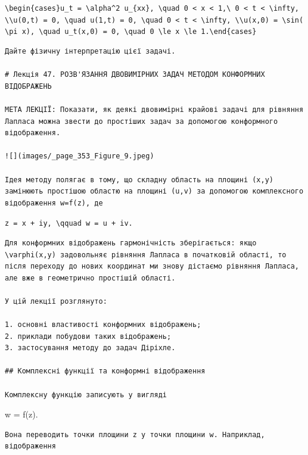 \documentclass[
  ukrainian,
]{article}
\begin{document}
\texttt{\textbackslash{}begin\{cases\}u\_t\ =\ \textbackslash{}alpha\^{}2\ u\_\{xx\},\ \textbackslash{}quad\ 0\ \textless{}\ x\ \textless{}\ 1,\textbackslash{}\ 0\ \textless{}\ t\ \textless{}\ \textbackslash{}infty,\ \textbackslash{}\textbackslash{}u(0,t)\ =\ 0,\ \textbackslash{}quad\ u(1,t)\ =\ 0,\ \textbackslash{}quad\ 0\ \textless{}\ t\ \textless{}\ \textbackslash{}infty,\ \textbackslash{}\textbackslash{}u(x,0)\ =\ \textbackslash{}sin(\textbackslash{}pi\ x),\ \textbackslash{}quad\ u\_t(x,0)\ =\ 0,\ \textbackslash{}quad\ 0\ \textbackslash{}le\ x\ \textbackslash{}le\ 1.\textbackslash{}end\{cases\}}

\begin{verbatim}
Дайте фізичну інтерпретацію цієї задачі.

# Лекція 47. РОЗВ'ЯЗАННЯ ДВОВИМІРНИХ ЗАДАЧ МЕТОДОМ КОНФОРМНИХ ВІДОБРАЖЕНЬ

МЕТА ЛЕКЦІЇ: Показати, як деякі двовимірні крайові задачі для рівняння Лапласа можна звести до простіших задач за допомогою конформного відображення.

![](images/_page_353_Figure_9.jpeg)

Ідея методу полягає в тому, що складну область на площині (x,y) замінюють простішою областю на площині (u,v) за допомогою комплексного відображення w=f(z), де
\end{verbatim}

\texttt{z\ =\ x\ +\ iy,\ \textbackslash{}qquad\ w\ =\ u\ +\ iv.}

\begin{verbatim}
Для конформних відображень гармонічність зберігається: якщо \varphi(x,y) задовольняє рівняння Лапласа в початковій області, то після переходу до нових координат ми знову дістаємо рівняння Лапласа, але вже в геометрично простішій області.

У цій лекції розглянуто:

1. основні властивості конформних відображень;
2. приклади побудови таких відображень;
3. застосування методу до задач Діріхле.

## Комплексні функції та конформні відображення

Комплексну функцію записують у вигляді
\end{verbatim}

w = f(z).

\begin{verbatim}
Вона переводить точки площини z у точки площини w. Наприклад, відображення
\end{verbatim}
\end{document}
